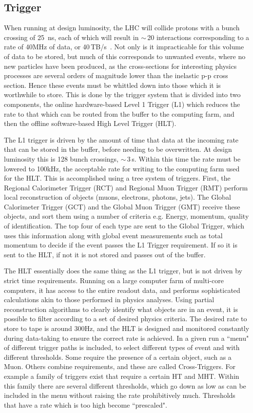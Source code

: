 \subsection{Trigger}
\label{sec:detrig}
When running at design luminosity, the LHC will collide protons with a bunch crossing of 25~ns, each of which will result in $\sim$\,20 interactions corresponding to a rate of 40MHz of data, or 40\,TB/s~\cite{TRIGTDR}. Not only is it impracticable for this volume of data to be stored, but much of this corresponds to unwanted events, where no new particles have been produced, as the cross-sections for interesting physics processes are several orders of magnitude lower than the inelastic p-p cross section. Hence these events must be whittled down into those which it is worthwhile to store. This is done by the trigger system that is divided into two components, the online hardware-based Level 1 Trigger (L1) which reduces the rate to that which can be routed from the buffer to the computing farm, and then the offline software-based High Level Trigger (HLT). 

The L1 trigger is driven by the amount of time that data at the incoming rate that can be stored in the buffer, before needing to be overwritten. At design luminosity this is 128 bunch crossings, $\sim$\,3\,\textmu s. Within this time the rate must be lowered to 100kHz, the acceptable rate for writing to the computing farm used for the HLT. This is accomplished using a tree system of triggers. First, the Regional Calorimeter Trigger (RCT) and Regional Muon Trigger (RMT) perform local reconstruction of objects (muons, electrons, photons, jets). The Global Calorimeter Trigger (GCT) and the Global Muon Trigger (GMT) receive these objects, and sort them using a number of criteria e.g. Energy, momentum, quality of identification. The top four of each type are sent to the Global Trigger, which uses this information along with global event measurements such as total momentum to decide if the event passes the L1 Trigger requirement. If so it is sent to the HLT, if not it is not stored and passes out of the buffer. 

The HLT essentially does the same thing as the L1 trigger, but is not driven by strict time requirements. Running on a large computer farm of multi-core computers, it has access to the entire readout data, and performs sophisticated calculations akin to those performed in physics analyses. Using partial reconstruction algorithms to clearly identify what objects are in an event, it is possible to filter according to a set of desired physics criteria.  The desired rate to store to tape is around 300Hz, and the HLT is designed and monitored constantly during data-taking to ensure the correct rate is achieved. In a given run a ``menu" of different trigger paths is included, to select different types of event and with different thresholds. Some require the presence of a certain object, such as a Muon. Others combine requirements, and these are called Cross-Triggers. For example a family of triggers exist that require a certain HT and MHT. Within this family there are several different thresholds, which go down as low as can be included in the menu without raising the rate prohibitively much. Thresholds that have a rate which is too high become ``prescaled".
